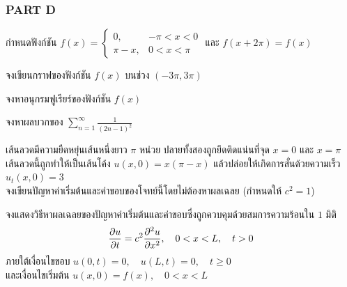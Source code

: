 \documentclass[12pt,final]{novelette} %
\begin{document}
\subsubsection*{PART D}

\begin{question}[resume]
    \item {}
    กำหนดฟังก์ชัน
    $f(x) = \begin{cases}
            0,       & -\pi < x < 0 \\
            \pi - x, & 0 < x < \pi
        \end{cases}$ และ $f(x + 2\pi) = f(x)$
    \begin{question}
        \item
        จงเขียนกราฟของฟังก์ชัน $f(x)$ บนช่วง $(-3\pi, 3\pi)$



        \item
        จงหาอนุกรมฟูเรียร์ของฟังก์ชัน $f(x)$



        \item
        จงหาผลบวกของ $\displaystyle \sum_{n=1}^{\infty} \frac{1}{(2n - 1)^2}$ 


    \end{question}

    \item {}
    เส้นลวดมีความยืดหยุ่นเส้นหนึ่งยาว $\pi$ หน่วย ปลายทั้งสองถูกยึดติดแน่นที่จุด $x = 0$ และ $x = \pi$ \\
    เส้นลวดนี้ถูกทำให้เป็นเส้นโค้ง $u(x, 0) = x(\pi - x)$ แล้วปล่อยให้เกิดการสั่นด้วยความเร็ว $u_t(x, 0) = 3$ \\
    จงเขียนปัญหาค่าเริ่มต้นและค่าขอบของโจทย์นี้โดยไม่ต้องหาผลเฉลย (กำหนดให้ $c^2 = 1$) 



    \item {}
    จงแสดงวิธีหาผลเฉลยของปัญหาค่าเริ่มต้นและค่าขอบซึ่งถูกควบคุมด้วยสมการความร้อนใน $1$ มิติ
    $$
        \pdv{u}{t} = c^2 \pdv[2]{u}{x}, \quad 0 < x < L, \quad t > 0
    $$
    ภายใต้เงื่อนไขขอบ \quad $u(0, t) = 0, \quad u(L, t) = 0, \quad t \geq 0$ \\
    และเงื่อนไขเริ่มต้น \quad $u(x, 0) = f(x), \quad 0 < x < L$ 


\end{question}
\end{document}
